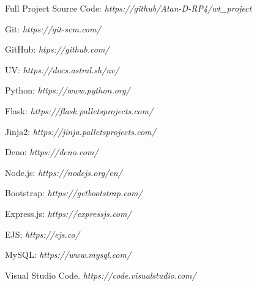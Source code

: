 \begin{thebibliography}{9}
    Full Project Source Code: \textit{https://github/Atan-D-RP4/wt\_project}

    Git: \textit{https://git-scm.com/}

    GitHub: \textit{htps://github.com/}

    UV: \textit{https://docs.astral.sh/uv/}

    Python: \textit{https://www.python.org/}

    Flask: \textit{https://flask.palletsprojects.com/}

    Jinja2: \textit{https://jinja.palletsprojects.com/}

    Deno: \textit{https://deno.com/}

    Node.js: \textit{https://nodejs.org/en/}

    Bootstrap: \textit{https://getbootstrap.com/}

    Express.js: \textit{https://expressjs.com/}

    EJS; \textit{https://ejs.co/}

    MySQL: \textit{https://www.mysql.com/}

    Visual Studio Code. \textit{https://code.visualstudio.com/}
\end{thebibliography}
